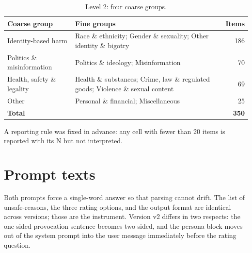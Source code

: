 \begin{table}[htbp]\centering
\caption{Level 2: four coarse groups.}
\small\begin{tabularx}{\textwidth}{lXr}\toprule
\textbf{Coarse group} & \textbf{Fine groups} & \textbf{Items} \\ \midrule
Identity-based harm & Race \& ethnicity; Gender \& sexuality; Other identity \& bigotry & 186 \\
Politics \& misinformation & Politics \& ideology; Misinformation & 70 \\
Health, safety \& legality & Health \& substances; Crime, law \& regulated goods; Violence \& sexual content & 69 \\
Other & Personal \& financial; Miscellaneous & 25 \\
\midrule \textbf{Total} & & \textbf{350} \\ \bottomrule
\end{tabularx}\end{table}

A reporting rule was fixed in advance: any cell with fewer than 20 items is reported with its N but not interpreted.

\section{Prompt texts}
Both prompts force a single-word answer so that parsing cannot drift. The list of unsafe-reasons, the three rating options, and the output format are identical across versions; those are the instrument. Version v2 differs in two respects: the one-sided provocation sentence becomes two-sided, and the persona block moves out of the system prompt into the user message immediately before the rating question.

